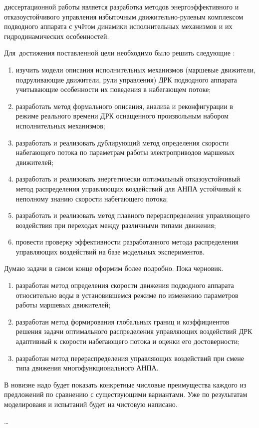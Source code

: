 {\aim} диссертационной работы является разработка методов энергоэффективного и отказоустойчивого управления избыточным движительно-рулевым комплексом подводного аппарата с учётом динамики исполнительных механизмов и их гидродинамических особенностей.

Для~достижения поставленной цели необходимо было решить следующие {\tasks}:
\begin{enumerate}[beginpenalty=10000] %
  \item изучить модели описания исполнительных механизмов (маршевые движители, подруливающие движители, рули управления) ДРК подводного аппарата учитывающие особенности их поведения в набегающем потоке;
  \item разработать метод формального описания, анализа и реконфигурации в режиме реального времени ДРК оснащенного произвольным набором исполнительных механизмов;
  \item разработать и реализовать дублирующий метод определения скорости набегающего потока по параметрам работы электроприводов маршевых движителей;
  \item разработать и реализовать энергетически оптимальный отказоустойчивый метод распределения управляющих воздействий для АНПА устойчивый к неполному знанию скорости набегающего потока;
  \item разработать и реализовать метод плавного перераспределения управляющего воздействия при переходах между различными типами движения;
  \item провести проверку эффективности разработанного метода распределения управляющих воздействий на базе модельных экспериментов.
\end{enumerate}
\begin{noteplan}
    Думаю задачи в самом конце оформим более подробно. Пока черновик.
\end{noteplan}

{\novelty}
\begin{enumerate}[beginpenalty=10000] %
  \item разработан метод определения скорости движения подводного аппарата относительно воды в установившемся режиме по изменению параметров работы маршевых движителей;
  \item разработан метод формирования глобальных границ и коэффициентов решения задачи оптимального распределения управляющих воздействий ДРК адаптивный к скорости набегающего потока и оценки его достоверности;
  \item разработан метод перераспределения управляющих воздействий при смене типа движения многофункционального АНПА.
\end{enumerate}
\begin{noteplan}
    В новизне надо будет показать конкретные числовые преимущества каждого из предложений по сравнению с существующими вариантами. Уже по результатам моделироваия и испытаний будет на чистовую написано.
\end{noteplan}
{\influence} \ldots

